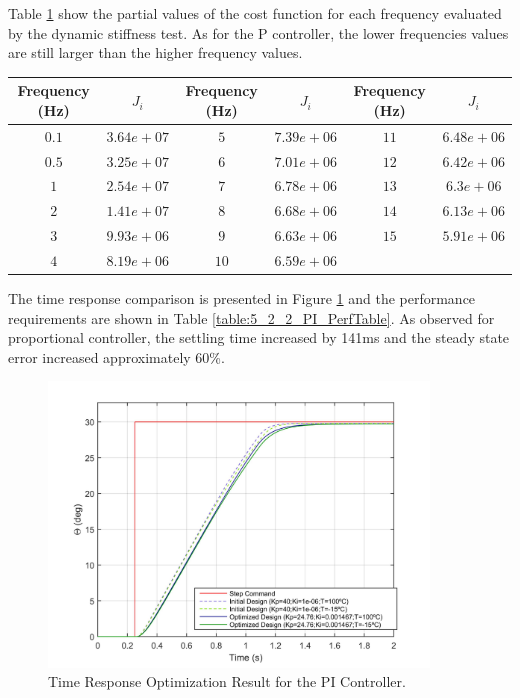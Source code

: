 Table \ref{table:5_2_2_PI_CostFunctionTable} show the partial values of the cost function for each frequency evaluated by the dynamic stiffness test. As for the P controller, the lower frequencies values are still larger than the higher frequency values.

\begin{table}[H]
	\label{table:5_2_2_PI_CostFunctionTable}
	\centering
	\resizebox{14cm}{!} {
		\begin{tabular}{|c|c|c|c|c|c|}
			\hline
			Frequency (Hz) & $J_i$ & Frequency (Hz) & $J_i$ & Frequency (Hz) & $J_i$ \\ \hline
			$0.1$ & $3.64e+07$ & $5$ & $7.39e+06$ & $11$ & $6.48e+06$ \\ \hline
			$0.5$ & $3.25e+07$ & $6$ & $7.01e+06$ & $12$ & $6.42e+06$ \\ \hline
			$1$ & $2.54e+07$ & $7$ & $6.78e+06$ & $13$ & $6.3e+06$ \\ \hline
			$2$ & $1.41e+07$ & $8$ & $6.68e+06$ & $14$ & $6.13e+06$ \\ \hline
			$3$ & $9.93e+06$ & $9$ & $6.63e+06$ & $15$ & $5.91e+06$ \\ \hline
			$4$ & $8.19e+06$ & $10$ & $6.59e+06$ &  &  \\ \hline
	\end{tabular}}
\end{table}

The time response comparison is presented in Figure \ref{fig:5_2_2_PI_TimeResp} and the performance requirements are shown in Table \ref{table:5_2_2_PI_PerfTable}. As observed for proportional controller, the settling time increased by 141ms and the steady state error increased approximately 60\%.

\begin{figure}[H]
	\centering
	\centerline{\includegraphics[width=0.9\textwidth]{Figuras/5.OptimizationResults/5-2-2-PI-TimeResponseComparison.jpg}}
	\caption{Time Response Optimization Result for the PI Controller.}
	\label{fig:5_2_2_PI_TimeResp}
\end{figure}


